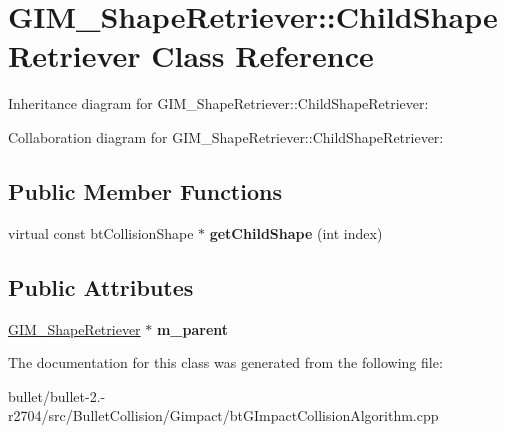 \hypertarget{class_g_i_m___shape_retriever_1_1_child_shape_retriever}{\section{G\+I\+M\+\_\+\+Shape\+Retriever\+:\+:Child\+Shape\+Retriever Class Reference}
\label{class_g_i_m___shape_retriever_1_1_child_shape_retriever}
}


Inheritance diagram for G\+I\+M\+\_\+\+Shape\+Retriever\+:\+:Child\+Shape\+Retriever\+:


Collaboration diagram for G\+I\+M\+\_\+\+Shape\+Retriever\+:\+:Child\+Shape\+Retriever\+:
\subsection*{Public Member Functions}
\begin{DoxyCompactItemize}
\item 
\hypertarget{class_g_i_m___shape_retriever_1_1_child_shape_retriever_a6b3a147fb160d3d117a203e7472a7dbe}{virtual const bt\+Collision\+Shape $\ast$ {\bfseries get\+Child\+Shape} (int index)}\label{class_g_i_m___shape_retriever_1_1_child_shape_retriever_a6b3a147fb160d3d117a203e7472a7dbe}

\end{DoxyCompactItemize}
\subsection*{Public Attributes}
\begin{DoxyCompactItemize}
\item 
\hypertarget{class_g_i_m___shape_retriever_1_1_child_shape_retriever_a9348822849ba8c562aa4240ef5132a99}{\hyperlink{class_g_i_m___shape_retriever}{G\+I\+M\+\_\+\+Shape\+Retriever} $\ast$ {\bfseries m\+\_\+parent}}\label{class_g_i_m___shape_retriever_1_1_child_shape_retriever_a9348822849ba8c562aa4240ef5132a99}

\end{DoxyCompactItemize}


The documentation for this class was generated from the following file\+:\begin{DoxyCompactItemize}
\item 
bullet/bullet-\/2.-\/r2704/src/\+Bullet\+Collision/\+Gimpact/bt\+G\+Impact\+Collision\+Algorithm.\+cpp\end{DoxyCompactItemize}
